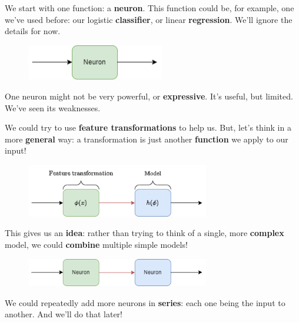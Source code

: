         We start with one function: a \textbf{neuron}. This function could be, for example, one we've used before: our logistic \textbf{classifier}, or linear \textbf{regression}. We'll ignore the details for now.
       
        \begin{figure}[H]
            \centering
            \includegraphics[width=60mm,scale=0.4]{images/nn_images/neuron.png}
        \end{figure}
       
        One neuron might not be very powerful, or \textbf{expressive}. It's useful, but limited. We've seen its weaknesses.
       
        We could try to use \textbf{feature transformations} to help us. But, let's think in a more \textbf{general} way: a transformation is just another \textbf{function} we apply to our input!
       
        \begin{figure}[H]
            \centering
            \includegraphics[width=80mm,scale=0.4]{images/nn_images/feature_transform.png}
        \end{figure}
       
        This gives us an \textbf{idea}: rather than trying to think of a single, more \textbf{complex} model, we could \textbf{combine} multiple simple models!
       
        \begin{figure}[H]
        \centering
            \includegraphics[width=80mm,scale=0.4]{images/nn_images/two_neurons.png}
        \end{figure}
        
        We could repeatedly add more neurons in \textbf{series}: each one being the input to another. And we'll do that later!
        
